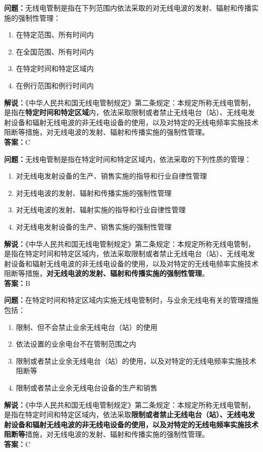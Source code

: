 \bigskip


\noindent\textbf{问题：}无线电管制是指在下列范围内依法采取的对无线电波的发射、辐射和传播实施的强制性管理：
\begin{enumerate}[label=\Alph*), leftmargin=3em]
	\item 在特定范围、所有时间内
	\item 在全国范围、所有时间内
	\item 在特定时间和特定区域内
	\item 在例行范围和例行时间内
\end{enumerate}
\noindent\textbf{解说：}《中华人民共和国无线电管制规定》第二条规定：本规定所称无线电管制，是指在\textbf{特定时间和特定区域}内，依法采取限制或者禁止无线电台（站）、无线电发射设备和辐射无线电波的非无线电设备的使用，以及对特定的无线电频率实施技术阻断等措施，对无线电波的发射、辐射和传播实施的强制性管理。\\\noindent\textbf{答案：}C



\bigskip


\noindent\textbf{问题：}无线电管制是指在特定时间和特定区域内，依法采取的下列性质的管理：
\begin{enumerate}[label=\Alph*), leftmargin=3em]
	\item 对无线电发射设备的生产、销售实施的指导和行业自律性管理
	\item 对无线电波的发射、辐射和传播实施的强制性管理
	\item 对无线电波的发射、辐射实施的指导和行业自律性管理
	\item 对无线电发射设备的生产、销售实施的强制性管理
\end{enumerate}
\noindent\textbf{解说：}《中华人民共和国无线电管制规定》第二条规定：本规定所称无线电管制，是指在特定时间和特定区域内，依法采取限制或者禁止无线电台（站）、无线电发射设备和辐射无线电波的非无线电设备的使用，以及对特定的无线电频率实施技术阻断等措施，\textbf{对无线电波的发射、辐射和传播实施的强制性管理}。\\\noindent\textbf{答案：}B


\bigskip


\noindent\textbf{问题：}在特定时间和特定区域内实施无线电管制时，与业余无线电有关的管理措施包括：
\begin{enumerate}[label=\Alph*), leftmargin=3em]
	\item 限制、但不会禁止业余无线电台（站）的使用
	\item 依法设置的业余电台不在管制范围之内
	\item 限制或者禁止业余无线电台（站）的使用，以及对特定的无线电频率实施技术阻断等
	\item 限制或者禁止业余无线电台设备的生产和销售
\end{enumerate}
\noindent\textbf{解说：}《中华人民共和国无线电管制规定》第二条规定：本规定所称无线电管制，是指在特定时间和特定区域内，依法采取\textbf{限制或者禁止无线电台（站）、无线电发射设备和辐射无线电波的非无线电设备的使用，以及对特定的无线电频率实施技术阻断等}措施，对无线电波的发射、辐射和传播实施的强制性管理。\\\noindent\textbf{答案：}C


